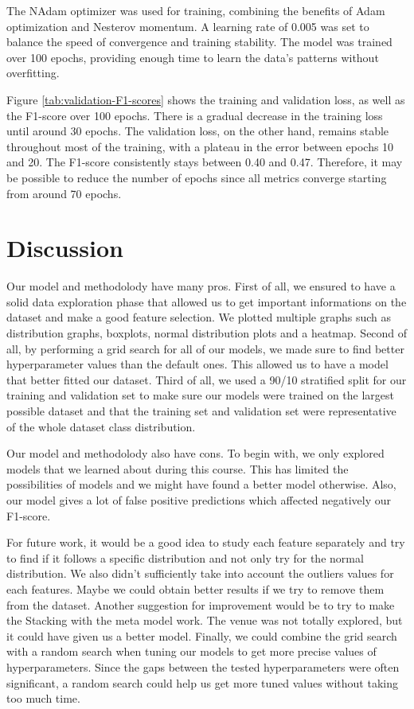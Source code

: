 \documentclass{article} %
\begin{document}
The NAdam optimizer was used for training, combining the benefits of Adam optimization and Nesterov momentum. A learning rate of 0.005 was set to balance the speed of convergence and training stability. The model was trained over 100 epochs, providing enough time to learn the data's patterns without overfitting.


Figure \ref{tab:validation-F1-scores} shows the training and validation loss, as well as the F1-score over 100 epochs. There is a gradual decrease in the training loss until around 30 epochs. The validation loss, on the other hand, remains stable throughout most of the training, with a plateau in the error between epochs 10 and 20. The F1-score consistently stays between 0.40 and 0.47. Therefore, it may be possible to reduce the number of epochs since all metrics converge starting from around 70 epochs.


\section{Discussion}

Our model and methodolody have many pros. First of all, we ensured to have a solid data exploration phase that allowed us to get 
important informations on the dataset and make a good feature selection. We plotted multiple graphs such as distribution graphs, 
boxplots, normal distribution plots and a heatmap. Second of all, by performing a grid search for all of our models, we made sure to 
find better hyperparameter values than the default ones. This allowed us to have a model that better fitted our dataset. Third of all, 
we used a 90/10 stratified split for our training and validation set to make sure our models were trained on the largest possible 
dataset and that the training set and validation set were representative of the whole dataset class distribution.

Our model and methodolody also have cons. To begin with, we only explored models that we learned about during this course. This has 
limited the possibilities of models and we might have found a better model otherwise. Also, our model gives a lot of false positive 
predictions which affected negatively our F1-score.

For future work, it would be a good idea to study each feature separately and try to find if it follows a specific distribution and not 
only try for the normal distribution. We also didn't sufficiently take into account the outliers values for each features. Maybe we 
could obtain better results if we try to remove them from the dataset. Another suggestion for improvement would be to try to make the 
Stacking with the meta model work. The venue was not totally explored, but it could have given us a better model. Finally, we could 
combine the grid search with a random search when tuning our models to get more precise values of hyperparameters. Since the gaps 
between the tested hyperparameters were often significant, a random search could help us get more tuned values without taking too much 
time. 
\end{document}

